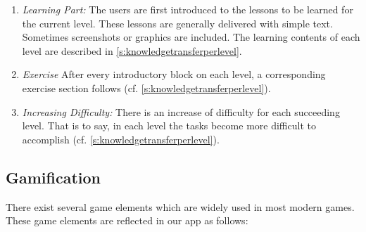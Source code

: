 \begin{enumerate}
\begin{enumerate}
	\item \textit{Learning Part:} 
The users are first introduced to the lessons to be learned for the current level.
These lessons are generally delivered with simple text.
Sometimes screenshots or graphics are included.
 The learning contents of each level are described in \autoref{s:knowledgetransferperlevel}.
		\item \textit{Exercise} After every introductory block on each level, a corresponding exercise section follows (cf. \autoref{s:knowledgetransferperlevel}).
		\item \textit{Increasing Difficulty:} There is an increase of difficulty for each succeeding level.
 That is to say, in each level the tasks become more difficult to accomplish (cf. \autoref{s:knowledgetransferperlevel}).
\end{enumerate}
\end{enumerate}


\subsection{Gamification}
There exist several game elements which are widely used in most modern games.
These game elements are reflected in our app as follows:

